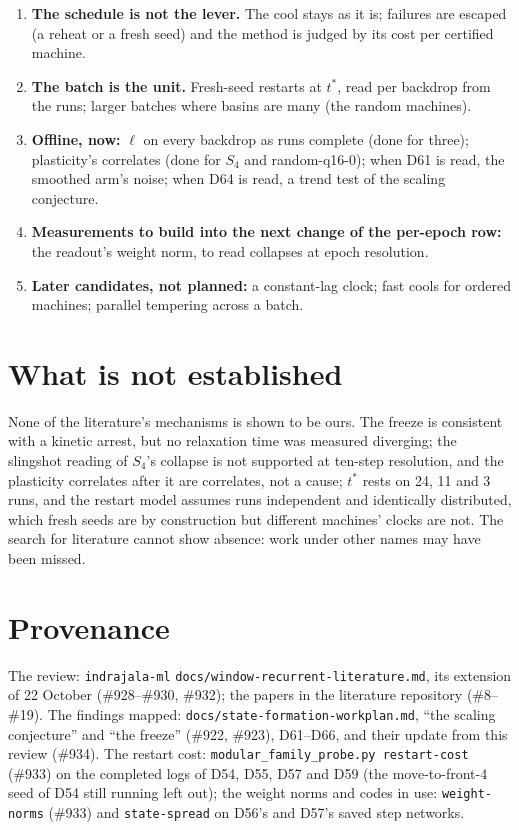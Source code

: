 \documentclass[11pt]{article}
\begin{document}
\begin{enumerate}
\item \textbf{The schedule is not the lever.} The cool stays as it is; failures are escaped (a reheat
or a fresh seed) and the method is judged by its cost per certified machine.
\item \textbf{The batch is the unit.} Fresh-seed restarts at $t^*$, read per backdrop from the runs;
larger batches where basins are many (the random machines).
\item \textbf{Offline, now:} $\ell$ on every backdrop as runs complete (done for three); plasticity's
correlates (done for $S_4$ and random-q16-0); when D61 is read, the smoothed arm's noise; when D64 is
read, a trend test of the scaling conjecture.
\item \textbf{Measurements to build into the next change of the per-epoch row:} the readout's weight
norm, to read collapses at epoch resolution.
\item \textbf{Later candidates, not planned:} a constant-lag clock; fast cools for ordered machines;
parallel tempering across a batch.
\end{enumerate}

\section{What is not established}

None of the literature's mechanisms is shown to be ours. The freeze is consistent with a kinetic
arrest, but no relaxation time was measured diverging; the slingshot reading of $S_4$'s collapse is
not supported at ten-step resolution, and the plasticity correlates after it are correlates, not a
cause; $t^*$ rests on 24, 11 and 3 runs, and the restart
model assumes runs independent and identically distributed, which fresh seeds are by construction
but different machines' clocks are not. The search for literature cannot show absence: work under
other names may have been missed.

\section{Provenance}

The review: \texttt{indrajala-ml} \texttt{docs/\allowbreak window-recurrent-\allowbreak literature.md}, its extension of
22 October (\#928--\#930, \#932); the papers in the literature repository (\#8--\#19). The findings
mapped: \texttt{docs/\allowbreak state-formation-\allowbreak workplan.md}, ``the scaling conjecture'' and ``the freeze''
(\#922, \#923), D61--D66, and their update from this review (\#934). The restart cost: \texttt{modular\_family\_probe.py restart-cost} (\#933) on the
completed logs of D54, D55, D57 and D59 (the move-to-front-4 seed of D54 still running left out);
the weight norms and codes in use: \texttt{weight-norms} (\#933) and \texttt{state-spread} on D56's and
D57's saved step networks.



\end{document}
